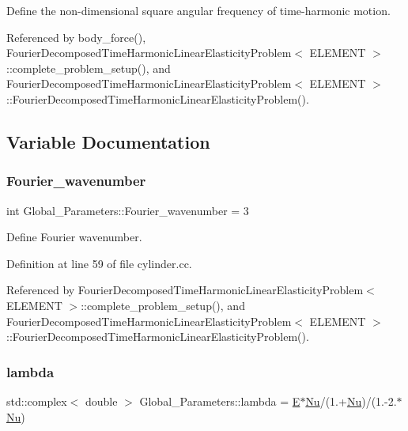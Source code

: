 Define the non-\/dimensional square angular frequency of time-\/harmonic motion. 



Referenced by body\+\_\+force(), Fourier\+Decomposed\+Time\+Harmonic\+Linear\+Elasticity\+Problem$<$ E\+L\+E\+M\+E\+N\+T $>$\+::complete\+\_\+problem\+\_\+setup(), and Fourier\+Decomposed\+Time\+Harmonic\+Linear\+Elasticity\+Problem$<$ E\+L\+E\+M\+E\+N\+T $>$\+::\+Fourier\+Decomposed\+Time\+Harmonic\+Linear\+Elasticity\+Problem().



\subsection{Variable Documentation}
\mbox{\label{namespaceGlobal__Parameters_ae1198385d90f52c4ed921520ae43a9e7}} 
\subsubsection{\texorpdfstring{Fourier\+\_\+wavenumber}{Fourier\_wavenumber}}
{\footnotesize\ttfamily int Global\+\_\+\+Parameters\+::\+Fourier\+\_\+wavenumber = 3}



Define Fourier wavenumber. 



Definition at line 59 of file cylinder.\+cc.



Referenced by Fourier\+Decomposed\+Time\+Harmonic\+Linear\+Elasticity\+Problem$<$ E\+L\+E\+M\+E\+N\+T $>$\+::complete\+\_\+problem\+\_\+setup(), and Fourier\+Decomposed\+Time\+Harmonic\+Linear\+Elasticity\+Problem$<$ E\+L\+E\+M\+E\+N\+T $>$\+::\+Fourier\+Decomposed\+Time\+Harmonic\+Linear\+Elasticity\+Problem().

\mbox{\label{namespaceGlobal__Parameters_a2ecf9fe185c1e5b5cae06a6ed0a3b5a2}} 
\subsubsection{\texorpdfstring{lambda}{lambda}}
{\footnotesize\ttfamily std\+::complex$<$ double $>$ Global\+\_\+\+Parameters\+::lambda = \hyperlink{namespaceGlobal__Parameters_ac74d762d76b56416281173421b018460}{E}$\ast$\hyperlink{namespaceGlobal__Parameters_a5978c2a1498ec7775b228a11a3912209}{Nu}/(1.+\hyperlink{namespaceGlobal__Parameters_a5978c2a1498ec7775b228a11a3912209}{Nu})/(1.-\/2.$\ast$\hyperlink{namespaceGlobal__Parameters_a5978c2a1498ec7775b228a11a3912209}{Nu})}



